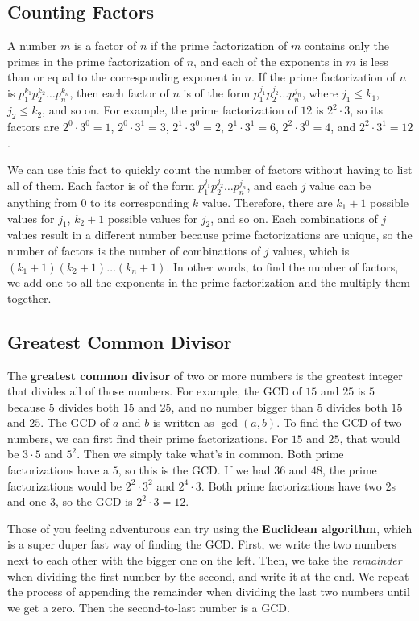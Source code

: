 \documentclass{article}
\begin{document}
\begin{multicols}{2}
	\subsection*{Counting Factors}
	A number $m$ is a factor of $n$ if the prime factorization of $m$ contains only the primes in the prime factorization of $n$, and each of the exponents in $m$ is less than or equal to the corresponding exponent in $n$.
	If the prime factorization of $n$ is $p_1^{k_1} p_2^{k_2} \dots p_n^{k_n}$, then each factor of $n$ is of the form $p_1^{j_1} p_2^{j_2} \dots p_n^{j_n}$, where $j_1 \leq k_1$, $j_2 \leq k_2$, and so on.
	For example, the prime factorization of $12$ is $2^2 \cdot 3$, so its factors are $2^0 \cdot 3^0 = 1$, $2^0 \cdot 3^1 = 3$, $2^1 \cdot 3^0 = 2$, $2^1 \cdot 3^1 = 6$, $2^2 \cdot 3^0 = 4$, and $2^2 \cdot 3^1 = 12$.
	
	We can use this fact to quickly count the number of factors without having to list all of them.
	Each factor is of the form $p_1^{j_1} p_2^{j_2} \dots p_n^{j_n}$, and each $j$ value can be anything from $0$ to its corresponding $k$ value.
	Therefore, there are $k_1 + 1$ possible values for $j_1$, $k_2 + 1$ possible values for $j_2$, and so on.
	Each combinations of $j$ values result in a different number because prime factorizations are unique, so the number of factors is the number of combinations of $j$ values, which is $(k_1 + 1)(k_2 + 1) \dots (k_n + 1)$.
	In other words, to find the number of factors, we add one to all the exponents in the prime factorization and the multiply them together.
	
	\subsection*{Greatest Common Divisor}
	The \textbf{greatest common divisor} of two or more numbers is the greatest integer that divides all of those numbers.
	For example, the GCD of $15$ and $25$ is $5$ because $5$ divides both $15$ and $25$, and no number bigger than $5$ divides both $15$ and $25$.
	The GCD of $a$ and $b$ is written as $\gcd(a, b)$.
	To find the GCD of two numbers, we can first find their prime factorizations.
	For $15$ and $25$, that would be $3 \cdot 5$ and $5^2$.
	Then we simply take what's in common.
	Both prime factorizations have a $5$, so this is the GCD.
	If we had $36$ and $48$, the prime factorizations would be $2^2 \cdot 3^2$ and $2^4 \cdot 3$.
	Both prime factorizations have two $2$s and one $3$, so the GCD is $2^2 \cdot 3 = 12$.
	
	Those of you feeling adventurous can try using the \textbf{Euclidean algorithm}, which is a super duper fast way of finding the GCD.
	First, we write the two numbers next to each other with the bigger one on the left.
	Then, we take the \emph{remainder} when dividing the first number by the second, and write it at the end.
	We repeat the process of appending the remainder when dividing the last two numbers until we get a zero.
	Then the second-to-last number is a GCD.
	

\end{multicols}
\end{document}
